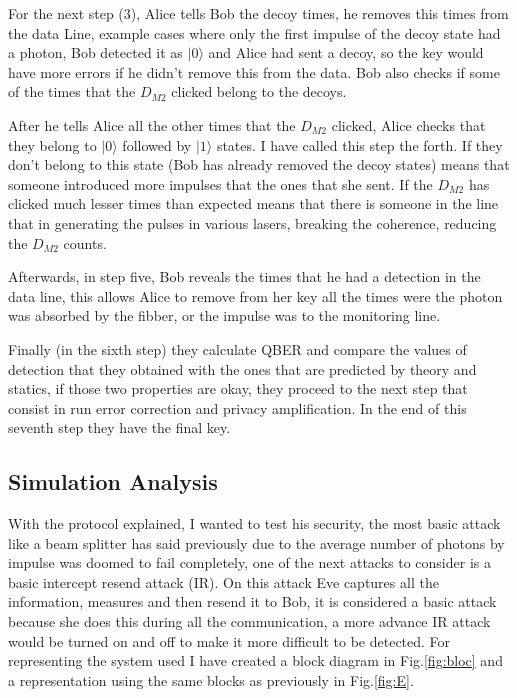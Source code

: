 \begin{refsection}
For the next step (3), Alice tells Bob the decoy times, he removes this times from the data Line, example cases where only the first impulse of the decoy state had a photon, Bob detected it as $|0\rangle$ and Alice had sent a decoy, so the key would have more errors if he didn't remove this from the data. Bob also checks if some of the times that the $D_{M2}$ clicked belong to the decoys.

After he tells Alice all the other times that the $D_{M2}$ clicked, Alice checks that they belong to $|0\rangle$ followed by $|1\rangle$ states. I have called this step the forth. If they don't belong to this state (Bob has already removed the decoy states) means that someone introduced more impulses that the ones that she sent. If the $D_{M2}$ has clicked much lesser times than expected means that there is someone in the line that in generating the pulses in various lasers, breaking the coherence, reducing the $D_{M2}$ counts.

Afterwards, in step five, Bob reveals the times that he had a detection in the data line, this allows Alice to remove from her key all the times were the photon was absorbed by the fibber, or the impulse was to the monitoring line.

Finally (in the sixth step) they calculate QBER and compare the values of detection that they obtained with the ones that are predicted by theory and statics, if those two properties are okay, they proceed to the next step that consist in run error correction and privacy amplification. In the end of this seventh step they have the final key.

\subsection{Simulation Analysis}

With the protocol explained, I wanted to test his security, the most basic attack like a beam splitter has said previously due to the average number of photons by impulse was doomed to fail completely, one of the next attacks to consider is a basic intercept resend attack (IR). On this attack Eve captures all the information, measures and then resend it to Bob, it is considered a basic attack because she does this during all the communication, a more advance IR attack would be turned on and off to make it more difficult to be detected. For representing the system used I have created a block diagram in Fig.\ref{fig:bloc} and a representation using the same blocks as previously in Fig.\ref{fig:E}.


\end{refsection}
